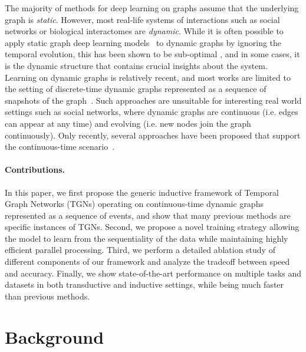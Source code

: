 \documentclass{article}
\begin{document}
The majority of methods for deep learning on graphs assume that the underlying graph is {\em static}. However, most real-life systems of interactions such as social networks or biological interactomes are {\em dynamic}. While it is often possible to apply static graph deep learning models~\citep{10.5555/1241540.1241551} to dynamic graphs by ignoring the temporal evolution, this has been shown to be sub-optimal \citep{Xu2020Inductive}, and in some cases, it is the dynamic structure that contains crucial insights about the system. 
%
Learning on dynamic graphs is relatively recent, and most works are limited to the setting of discrete-time dynamic graphs represented as a sequence of snapshots of the graph~\citep{10.5555/1241540.1241551, dunlavy2011temporal, yu20193d, sankar2020dysat, pareja2019evolvegcn, yu2018netwalk}. Such approaches are unsuitable for interesting real world settings such as social networks, where dynamic graphs are continuous (i.e. edges can appear at any time) and evolving (i.e. new nodes join the graph continuously). Only recently, several approaches have been proposed that support the continuous-time scenario~\citep{Xu2020Inductive, trivedi2018dyrep, 10.1145/3292500.3330895, ma2018streaming, 8622109, bastas2019evolve2vec}. %


    
\paragraph{Contributions.}
In this paper, we first propose the generic inductive framework of Temporal Graph Networks (TGNs) operating on continuous-time dynamic graphs represented as a sequence of events, and show that many previous methods are specific instances of TGNs. 
%
Second, we propose a novel training strategy allowing the model to learn from the sequentiality of the data while maintaining highly efficient parallel processing. 
%
Third, we perform a detailed ablation study of different components of our framework and analyze the tradeoff between speed and accuracy. 
Finally, we show state-of-the-art performance on multiple tasks and datasets in both transductive and inductive settings, while being much faster than previous methods. 

\section{Background}

\end{document}
